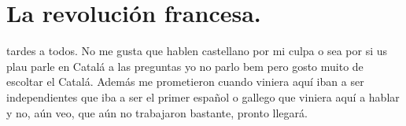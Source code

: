 \chapter{La revolución francesa.}

{}
{}%

 tardes a todos. No me gusta que hablen castellano por mi culpa o sea por si us plau parle en Catalá a las preguntas yo no parlo bem pero gosto muito de escoltar el Catalá. Además me prometieron cuando viniera aquí iban a ser independientes que iba a ser el primer español o gallego que viniera aquí a hablar y no, aún veo, que aún no trabajaron bastante, pronto llegará.

